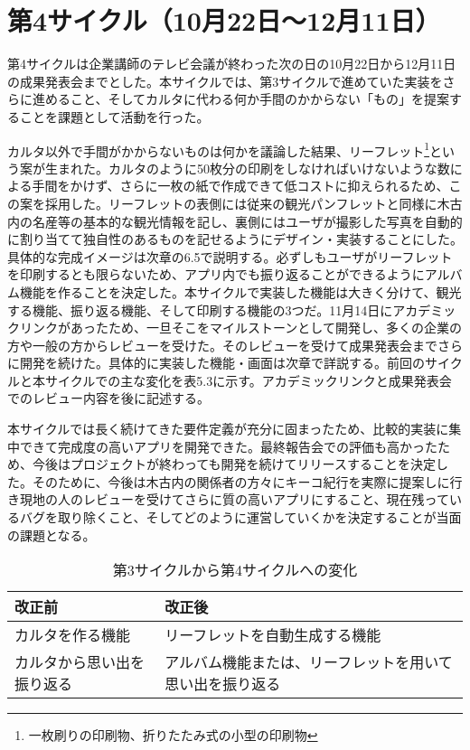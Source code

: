 \section{第4サイクル（10月22日～12月11日）}
第4サイクルは企業講師のテレビ会議が終わった次の日の10月22日から12月11日の成果発表会までとした。本サイクルでは、第3サイクルで進めていた実装をさらに進めること、そしてカルタに代わる何か手間のかからない「もの」を提案することを課題として活動を行った。
\par カルタ以外で手間がかからないものは何かを議論した結果、リーフレット\footnote{一枚刷りの印刷物、折りたたみ式の小型の印刷物}という案が生まれた。カルタのように50枚分の印刷をしなければいけないような数による手間をかけず、さらに一枚の紙で作成できて低コストに抑えられるため、この案を採用した。リーフレットの表側には従来の観光パンフレットと同様に木古内の名産等の基本的な観光情報を記し、裏側にはユーザが撮影した写真を自動的に割り当てて独自性のあるものを記せるようにデザイン・実装することにした。具体的な完成イメージは次章の6.5で説明する。必ずしもユーザがリーフレットを印刷するとも限らないため、アプリ内でも振り返ることができるようにアルバム機能を作ることを決定した。本サイクルで実装した機能は大きく分けて、観光する機能、振り返る機能、そして印刷する機能の3つだ。11月14日にアカデミックリンクがあったため、一旦そこをマイルストーンとして開発し、多くの企業の方や一般の方からレビューを受けた。そのレビューを受けて成果発表会までさらに開発を続けた。具体的に実装した機能・画面は次章で詳説する。前回のサイクルと本サイクルでの主な変化を表5.3に示す。アカデミックリンクと成果発表会でのレビュー内容を後に記述する。
\par 本サイクルでは長く続けてきた要件定義が充分に固まったため、比較的実装に集中できて完成度の高いアプリを開発できた。最終報告会での評価も高かったため、今後はプロジェクトが終わっても開発を続けてリリースすることを決定した。そのために、今後は木古内の関係者の方々にキーコ紀行を実際に提案しに行き現地の人のレビューを受けてさらに質の高いアプリにすること、現在残っているバグを取り除くこと、そしてどのように運営していくかを決定することが当面の課題となる。

\begin{table}[htb]
\centering
\addtocounter{table}{+0}
\caption{第3サイクルから第4サイクルへの変化}
  \begin{tabular}{|l|l|} \hline
    改正前&改正後  \\ \hline 
    カルタを作る機能 & \parbox{20zw}{リーフレットを自動生成する機能} \\  \hline
    カルタから思い出を振り返る &\parbox{20zw}{アルバム機能または、リーフレットを用いて思い出を振り返る}\rule[-6mm]{0mm}{14mm}\\ \hline
  \end{tabular} 
\end{table}


